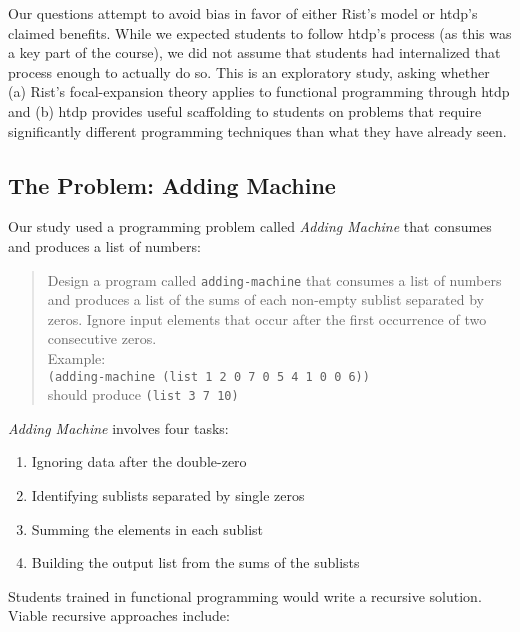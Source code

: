 \documentclass{sig-alternate-05-2015}
\newcommand{\htdp}{{\sc htdp}\xspace}
\def\problemName#1{\emph{#1}\xspace}
\def\Adding{\problemName{Adding Machine}}
\begin{document}
\noindent
Our questions attempt to avoid bias in favor of either Rist's model or \htdp's claimed benefits.  While we expected students to follow \htdp's process (as this was a key part of the course), we did not assume that students had internalized that process enough to actually do so. This is an exploratory study, asking whether (a) Rist's focal-expansion theory applies to functional programming through \htdp and (b) \htdp provides useful scaffolding to students on problems that require significantly different programming techniques than what they have already seen.

\subsection{The Problem: Adding Machine}
\label{sec:adding}

Our study used a programming problem called \Adding that consumes and produces a list of numbers:

\begin{quote}
Design a program called \texttt{adding-machine} that consumes a list of numbers and produces a list of the sums of each non-empty sublist separated by zeros. Ignore input elements that occur after the first occurrence of two consecutive zeros.\\

Example:\\
\lstinline{(adding-machine (list 1 2 0 7 0 5 4 1 0 0 6))} 
\\should produce \lstinline{(list 3 7 10)}
\end{quote}

\Adding involves four tasks:
\begin{enumerate}[label=\alph*),itemsep=-3pt]
	\item Ignoring data after the double-zero 
    \item Identifying sublists separated by single zeros
    \item Summing the elements in each sublist
    \item Building the output list from the sums of the sublists
\end{enumerate}

Students trained in functional programming would write a recursive solution.  Viable recursive approaches include:
\end{document}
